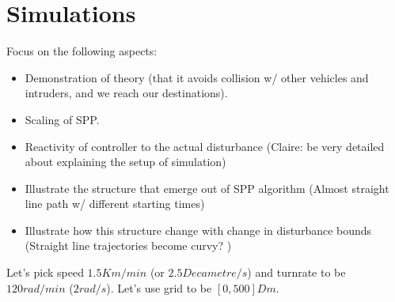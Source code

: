 \section{Simulations}

Focus on the following aspects:
\begin{itemize}
\item Demonstration of theory (that it avoids collision w/ other vehicles and intruders, and we reach our destinations).
\item Scaling of SPP.
\item Reactivity of controller to the actual disturbance (Claire: be very detailed about explaining the setup of simulation)
\item Illustrate the structure that emerge out of SPP algorithm (Almost straight line path w/ different starting times)
\item Illustrate how this structure change with change in disturbance bounds (Straight line trajectories become curvy? )
\end{itemize}


Let's pick speed $1.5 Km/min$ (or $2.5 Decametre/s$) and turnrate to be $120 rad/min$ ($2 rad/s$). Let's use grid to be $[0, 500] Dm$.